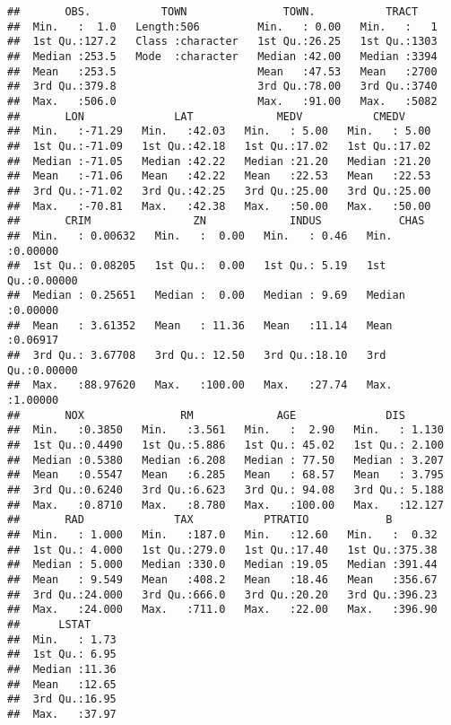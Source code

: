 \documentclass[
]{article}
\begin{document}
\begin{verbatim}
##       OBS.           TOWN               TOWN.           TRACT     
##  Min.   :  1.0   Length:506         Min.   : 0.00   Min.   :   1  
##  1st Qu.:127.2   Class :character   1st Qu.:26.25   1st Qu.:1303  
##  Median :253.5   Mode  :character   Median :42.00   Median :3394  
##  Mean   :253.5                      Mean   :47.53   Mean   :2700  
##  3rd Qu.:379.8                      3rd Qu.:78.00   3rd Qu.:3740  
##  Max.   :506.0                      Max.   :91.00   Max.   :5082  
##       LON              LAT             MEDV           CMEDV      
##  Min.   :-71.29   Min.   :42.03   Min.   : 5.00   Min.   : 5.00  
##  1st Qu.:-71.09   1st Qu.:42.18   1st Qu.:17.02   1st Qu.:17.02  
##  Median :-71.05   Median :42.22   Median :21.20   Median :21.20  
##  Mean   :-71.06   Mean   :42.22   Mean   :22.53   Mean   :22.53  
##  3rd Qu.:-71.02   3rd Qu.:42.25   3rd Qu.:25.00   3rd Qu.:25.00  
##  Max.   :-70.81   Max.   :42.38   Max.   :50.00   Max.   :50.00  
##       CRIM                ZN             INDUS            CHAS        
##  Min.   : 0.00632   Min.   :  0.00   Min.   : 0.46   Min.   :0.00000  
##  1st Qu.: 0.08205   1st Qu.:  0.00   1st Qu.: 5.19   1st Qu.:0.00000  
##  Median : 0.25651   Median :  0.00   Median : 9.69   Median :0.00000  
##  Mean   : 3.61352   Mean   : 11.36   Mean   :11.14   Mean   :0.06917  
##  3rd Qu.: 3.67708   3rd Qu.: 12.50   3rd Qu.:18.10   3rd Qu.:0.00000  
##  Max.   :88.97620   Max.   :100.00   Max.   :27.74   Max.   :1.00000  
##       NOX               RM             AGE              DIS        
##  Min.   :0.3850   Min.   :3.561   Min.   :  2.90   Min.   : 1.130  
##  1st Qu.:0.4490   1st Qu.:5.886   1st Qu.: 45.02   1st Qu.: 2.100  
##  Median :0.5380   Median :6.208   Median : 77.50   Median : 3.207  
##  Mean   :0.5547   Mean   :6.285   Mean   : 68.57   Mean   : 3.795  
##  3rd Qu.:0.6240   3rd Qu.:6.623   3rd Qu.: 94.08   3rd Qu.: 5.188  
##  Max.   :0.8710   Max.   :8.780   Max.   :100.00   Max.   :12.127  
##       RAD              TAX           PTRATIO            B         
##  Min.   : 1.000   Min.   :187.0   Min.   :12.60   Min.   :  0.32  
##  1st Qu.: 4.000   1st Qu.:279.0   1st Qu.:17.40   1st Qu.:375.38  
##  Median : 5.000   Median :330.0   Median :19.05   Median :391.44  
##  Mean   : 9.549   Mean   :408.2   Mean   :18.46   Mean   :356.67  
##  3rd Qu.:24.000   3rd Qu.:666.0   3rd Qu.:20.20   3rd Qu.:396.23  
##  Max.   :24.000   Max.   :711.0   Max.   :22.00   Max.   :396.90  
##      LSTAT      
##  Min.   : 1.73  
##  1st Qu.: 6.95  
##  Median :11.36  
##  Mean   :12.65  
##  3rd Qu.:16.95  
##  Max.   :37.97
\end{verbatim}
\end{document}
